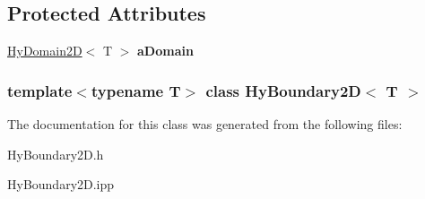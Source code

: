 \subsection*{Protected Attributes}
\begin{DoxyCompactItemize}
\item 
\hypertarget{classHyBoundary2D_a6f11087c0743f0917d98f97e53562b4b}{
\hyperlink{classHyDomain2D}{HyDomain2D}$<$ T $>$ {\bfseries aDomain}}
\label{classHyBoundary2D_a6f11087c0743f0917d98f97e53562b4b}

\end{DoxyCompactItemize}
\subsubsection*{template$<$typename T$>$ class HyBoundary2D$<$ T $>$}



The documentation for this class was generated from the following files:\begin{DoxyCompactItemize}
\item 
HyBoundary2D.h\item 
HyBoundary2D.ipp\end{DoxyCompactItemize}
